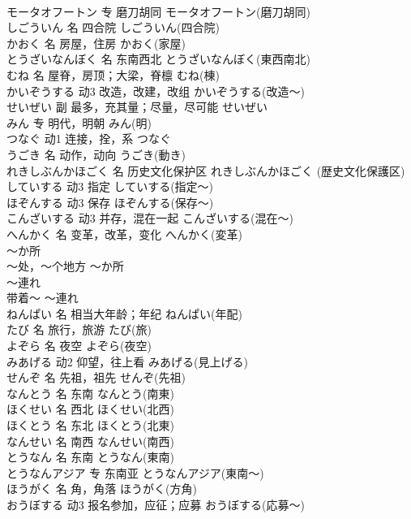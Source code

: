 \documentclass[8pt]{extreport}
\begin{document}
\begin{CJK}{UTF8}{min}
\\	モータオフートン	专	磨刀胡同	モータオフートン(磨刀胡同)	
\\	しごういん	名	四合院	しごういん(四合院)	
\\	かおく	名	房屋，住房	かおく(家屋)	
\\	とうざいなんぼく	名	东南西北	とうざいなんぼく(東西南北)	
\\	むね	名	屋脊，房顶；大梁，脊檩	むね(棟)	
\\	かいぞうする	动3	改造，改建，改组	かいぞうする(改造～)	
\\	せいぜい	副	最多，充其量；尽量，尽可能	せいぜい	
\\	みん	专	明代，明朝	みん(明)	
\\	つなぐ	动1	连接，拴，系	つなぐ	
\\	うごき	名	动作，动向	うごき(動き)	
\\	れきしぶんかほごく	名	历史文化保护区	れきしぶんかほごく (歴史文化保護区)	
\\	していする	动3	指定	していする(指定～)	
\\	ほぞんする	动3	保存	ほぞんする(保存～)	
\\	こんざいする	动3	并存，混在一起	こんざいする(混在～)	
\\	へんかく	名	变革，改革，变化	へんかく(変革)	
\\	～か所	
\\	～处，～个地方	～か所	
\\	～連れ	
\\	带着～	～連れ	
\\	ねんぱい	名	相当大年龄；年纪	ねんぱい(年配)	
\\	たび	名	旅行，旅游	たび(旅)	
\\	よぞら	名	夜空	よぞら(夜空)	
\\	みあげる	动2	仰望，往上看	みあげる(見上げる)	
\\	せんぞ	名	先祖，祖先	せんぞ(先祖)	
\\	なんとう	名	东南	なんとう(南東)	
\\	ほくせい	名	西北	ほくせい(北西)	
\\	ほくとう	名	东北	ほくとう(北東)	
\\	なんせい	名	南西	なんせい(南西)	
\\	とうなん	名	东南	とうなん(東南)	
\\	とうなんアジア	专	东南亚	とうなんアジア(東南～)	
\\	ほうがく	名	角，角落	ほうがく(方角)	
\\	おうぼする	动3	报名参加，应征；应募	おうぼする(応募～)	

\end{CJK}
\end{document}
